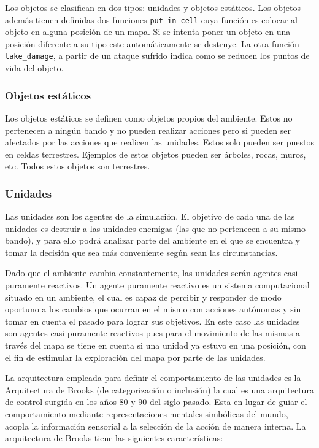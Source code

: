Los objetos se clasifican en dos tipos: unidades y objetos estáticos. Los objetos además tienen definidas dos funciones \verb|put_in_cell| cuya función es colocar al objeto en alguna posición de un mapa. Si se intenta poner un objeto en una posición diferente a su tipo este automáticamente se destruye. La otra función \verb|take_damage|, a partir de un ataque sufrido indica como se reducen los puntos de vida del objeto.

\subsubsection{Objetos estáticos}

Los objetos estáticos se definen como objetos propios del ambiente. Estos no pertenecen a ningún bando y no pueden realizar acciones pero si pueden ser afectados por las acciones que realicen las unidades. Estos solo pueden ser puestos en celdas terrestres. Ejemplos de estos objetos pueden ser árboles, rocas, muros, etc. Todos estos objetos son terrestres. 

\subsubsection{Unidades}

Las unidades son los agentes de la simulación. El objetivo de cada una de las unidades es destruir a las unidades enemigas (las que no pertenecen a su mismo bando), y para ello podrá analizar parte del ambiente en el que se encuentra y tomar la decisión que sea más conveniente según sean las circunstancias. 

Dado que el ambiente cambia constantemente, las unidades serán agentes casi puramente reactivos. Un agente puramente reactivo es un sistema computacional situado en un ambiente, el cual es capaz de percibir y responder de modo oportuno a los cambios que ocurran en el mismo con  acciones autónomas y sin tomar en cuenta el pasado para lograr sus objetivos. En este caso las unidades son agentes casi puramente reactivos pues para el movimiento de las mismas a través del mapa se tiene en cuenta si una unidad ya estuvo en una posición, con el fin de estimular la exploración del mapa por parte de las unidades.

La arquitectura empleada para definir el comportamiento de las unidades es la Arquitectura de Brooks (de categorización o inclusión) la cual es una arquitectura de control surgida en los años 80 y 90 del siglo pasado. Esta en lugar de guiar el comportamiento mediante representaciones mentales simbólicas del mundo, acopla la información sensorial  a la selección de la acción de manera interna. La arquitectura de Brooks tiene las siguientes características: 

